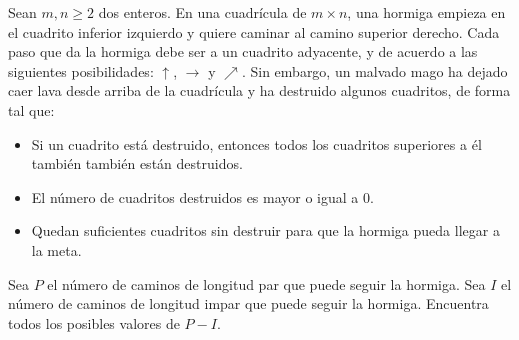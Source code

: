 Sean $m,n\geq 2$ dos enteros. En una cuadrícula de $m\times n$, una hormiga empieza en el cuadrito inferior izquierdo y quiere caminar al camino superior derecho. Cada paso que da la hormiga debe ser a un cuadrito adyacente, y de acuerdo a las siguientes posibilidades: $\uparrow$, $\rightarrow$ y $\nearrow$. Sin embargo, un malvado mago ha dejado caer lava desde arriba de la cuadrícula y ha destruido algunos cuadritos, de forma tal que:
 \begin{itemize} 
 \item Si un cuadrito está destruido, entonces todos los cuadritos superiores a él también también están destruidos.

 \item El número de cuadritos destruidos es mayor o igual a $0$.

 \item Quedan suficientes cuadritos sin destruir para que la hormiga pueda llegar a la meta. 
 \end{itemize} 
Sea $P$ el número de caminos de longitud par que puede seguir la hormiga. Sea $I$ el número de caminos de longitud impar que puede seguir la hormiga. Encuentra todos los posibles valores de $P-I$.